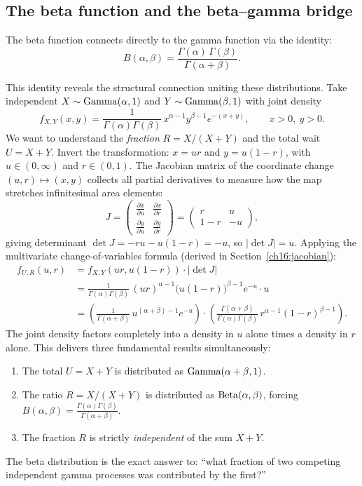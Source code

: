 \subsection{The beta function and the beta--gamma bridge}
The beta function connects directly to the gamma function via the identity:
\[
  B(\alpha,\beta) = \frac{\Gamma(\alpha)\,\Gamma(\beta)}{\Gamma(\alpha+\beta)}.
\]
\begin{whybox}
This identity reveals the structural connection uniting these distributions.
Take independent $X\sim\operatorname{Gamma}(\alpha,1)$ and $Y\sim\operatorname{Gamma}(\beta,1)$ with joint density
\[
  f_{X,Y}(x,y) = \frac{1}{\Gamma(\alpha)\Gamma(\beta)}\,x^{\alpha-1}y^{\beta-1}e^{-(x+y)}, \qquad x>0,\ y>0.
\]
We want to understand the \emph{fraction} $R = X/(X+Y)$ and the total wait $U = X+Y$.
Invert the transformation: $x = u r$ and $y = u(1-r)$, with $u \in (0,\infty)$ and $r \in (0,1)$.
The Jacobian matrix of the coordinate change $(u,r) \mapsto (x,y)$ collects all
partial derivatives to measure how the map stretches infinitesimal area elements:
\[
  J = \begin{pmatrix} \frac{\partial x}{\partial u} & \frac{\partial x}{\partial r} \\[4pt] \frac{\partial y}{\partial u} & \frac{\partial y}{\partial r} \end{pmatrix}
    = \begin{pmatrix} r & u \\ 1-r & -u \end{pmatrix},
\]
giving determinant $\det J = -ru - u(1-r) = -u$, so $|\det J| = u$.
Applying the multivariate change-of-variables formula (derived in Section~\ref{ch16:jacobian}):
\begin{align*}
  f_{U,R}(u,r) &= f_{X,Y}(ur, u(1-r))\cdot |\det J| \\
               &= \frac{1}{\Gamma(\alpha)\Gamma(\beta)}\,(ur)^{\alpha-1}\big(u(1-r)\big)^{\beta-1}e^{-u}\cdot u \\
               &= \left(\frac{1}{\Gamma(\alpha+\beta)}\,u^{(\alpha+\beta)-1}e^{-u}\right) \cdot \left(\frac{\Gamma(\alpha+\beta)}{\Gamma(\alpha)\Gamma(\beta)}\,r^{\alpha-1}(1-r)^{\beta-1}\right).
\end{align*}
The joint density factors completely into a density in $u$ alone times a density in $r$ alone.
This delivers three fundamental results simultaneously:
\begin{enumerate}
  \item The total $U = X+Y$ is distributed as $\operatorname{Gamma}(\alpha+\beta, 1)$.
  \item The ratio $R = X/(X+Y)$ is distributed as $\operatorname{Beta}(\alpha,\beta)$, forcing $B(\alpha,\beta) = \frac{\Gamma(\alpha)\Gamma(\beta)}{\Gamma(\alpha+\beta)}$.
  \item The fraction $R$ is strictly \emph{independent} of the sum $X+Y$.
\end{enumerate}
The beta distribution is the exact answer to: ``what fraction of two competing independent gamma processes was contributed by the first?''
\end{whybox}
